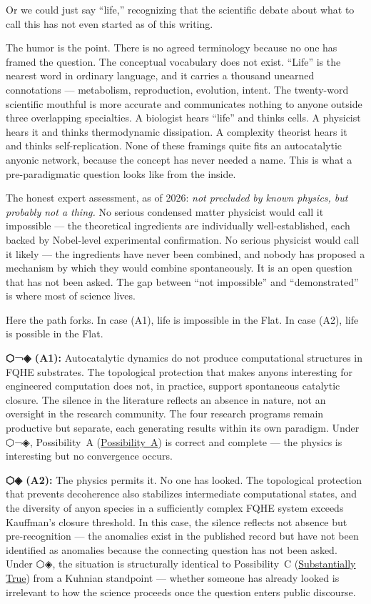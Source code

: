 Or we could just say ``life,'' recognizing that the scientific debate about what to call this has not even started as of this writing.

The humor is the point. There is no agreed terminology because no one has framed the question. The conceptual vocabulary does not exist. ``Life'' is the nearest word in ordinary language, and it carries a thousand unearned connotations --- metabolism, reproduction, evolution, intent. The twenty-word scientific mouthful is more accurate and communicates nothing to anyone outside three overlapping specialties. A biologist hears ``life'' and thinks cells. A physicist hears it and thinks thermodynamic dissipation. A complexity theorist hears it and thinks self-replication. None of these framings quite fits an autocatalytic anyonic network, because the concept has never needed a name. This is what a pre-paradigmatic question looks like from the inside.

The honest expert assessment, as of 2026: \emph{not precluded by known physics, but probably not a thing.} No serious condensed matter physicist would call it impossible --- the theoretical ingredients are individually well-established, each backed by Nobel-level experimental confirmation. No serious physicist would call it likely --- the ingredients have never been combined, and nobody has proposed a mechanism by which they would combine spontaneously. It is an open question that has not been asked. The gap between ``not impossible'' and ``demonstrated'' is where most of science lives.

Here the path forks. In case  (A1), life is impossible in the Flat. In case  (A2), life is possible in the Flat.

\textbf{⬡¬◈ (A1):} Autocatalytic dynamics do not produce computational structures in FQHE substrates. The topological protection that makes anyons interesting for engineered computation does not, in practice, support spontaneous catalytic closure. The silence in the literature reflects an absence in nature, not an oversight in the research community. The four research programs remain productive but separate, each generating results within its own paradigm. Under ⬡¬◈, Possibility~A (\hyperref[spine:option-a]{Possibility~A}) is correct and complete --- the physics is interesting but no convergence occurs.

\textbf{⬡◈ (A2):} The physics permits it. No one has looked. The topological protection that prevents decoherence also stabilizes intermediate computational states, and the diversity of anyon species in a sufficiently complex FQHE system exceeds Kauffman's closure threshold. In this case, the silence reflects not absence but pre-recognition --- the anomalies exist in the published record but have not been identified as anomalies because the connecting question has not been asked. Under ⬡◈, the situation is structurally identical to Possibility~C (\hyperref[spine:option-c]{Substantially True}) from a Kuhnian standpoint --- whether someone has already looked is irrelevant to how the science proceeds once the question enters public discourse.

